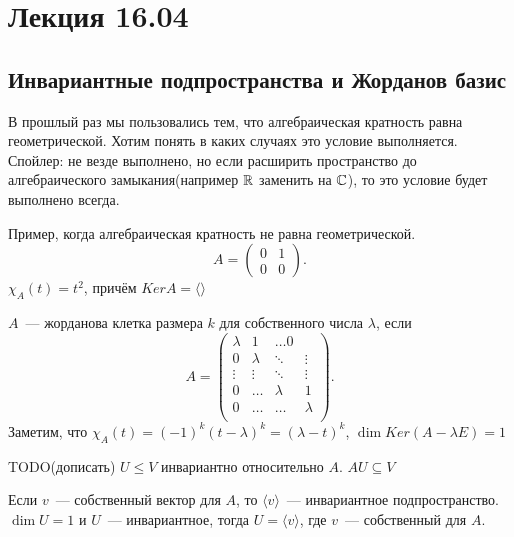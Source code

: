 \section{Лекция 16.04}
\subsection{Инвариантные подпространства и Жорданов базис}
\begin{motivation}
    В прошлый раз мы пользовались тем, что алгебраическая кратность равна геометрической. Хотим понять в каких случаях это условие
    выполняется. Спойлер: не везде выполнено, но если расширить пространство до алгебраического замыкания(например $\mathbb{R}$ заменить на $\mathbb{C}$),
    то это условие будет выполнено всегда.
\end{motivation}
\begin{example}
    Пример, когда алгебраическая кратность не равна геометрической.
     \[
         A = 
         \begin{pmatrix}
             0 & 1\\
             0 & 0
         \end{pmatrix}
    .\] 
    $\chi_A(t) = t^2$, причём $Ker A = \langle\rangle$
\end{example}
\begin{definition}
    $A$~--- жорданова клетка размера $k$ для собственного числа $\lambda$, если
     \[
         A = 
         \begin{pmatrix}
             \lambda & 1 & \dots 0\\
             0 & \lambda & \ddots & \vdots\\
             \vdots&\vdots&\ddots&\vdots\\
             0 & \dots & \lambda & 1\\
             0 & \dots & \dots & \lambda\\
         \end{pmatrix}
    .\] 
    Заметим, что $\chi_A(t) = (-1)^k(t-\lambda)^k= (\lambda-t)^k$,  $\dim Ker(A - \lambda E) = 1$
\end{definition}
\begin{definition}
    TODO(дописать)
    $U\le V$ инвариантно относительно $A$. $AU \subseteq V$
\end{definition}
\begin{remark}
    Если $v$~--- собственный вектор для $A$, то $\langle v \rangle$~--- инвариантное подпространство.
    $\dim U = 1$ и $U$~--- инвариантное, тогда $U = \langle v\rangle$, где  $v$~--- собственный для $A$.
\end{remark}
